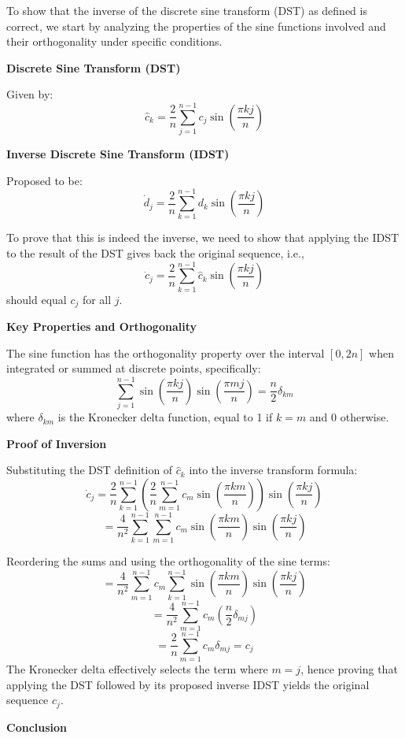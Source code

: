 \documentclass[8pt]{article}
\begin{document}
To show that the inverse of the discrete sine transform (DST) as defined is correct, we start by analyzing the properties of the sine functions involved and their orthogonality under specific conditions.

\textbf{Discrete Sine Transform (DST)}

Given by:
\[
\hat{c}_k = \frac{2}{n} \sum_{j=1}^{n-1} c_j \sin \left( \frac{\pi kj}{n} \right)
\]

\textbf{Inverse Discrete Sine Transform (IDST)}

Proposed to be:
\[
\dot{d}_j = \frac{2}{n} \sum_{k=1}^{n-1} d_k \sin \left( \frac{\pi kj}{n} \right)
\]

To prove that this is indeed the inverse, we need to show that applying the IDST to the result of the DST gives back the original sequence, i.e.,
\[
\dot{c}_j = \frac{2}{n} \sum_{k=1}^{n-1} \hat{c}_k \sin \left( \frac{\pi kj}{n} \right)
\]
should equal \( c_j \) for all \( j \).

\textbf{Key Properties and Orthogonality}

The sine function has the orthogonality property over the interval \([0, 2n]\) when integrated or summed at discrete points, specifically:
\[
\sum_{j=1}^{n-1} \sin \left( \frac{\pi kj}{n} \right) \sin \left( \frac{\pi mj}{n} \right) = \frac{n}{2} \delta_{km}
\]
where \( \delta_{km} \) is the Kronecker delta function, equal to 1 if \( k = m \) and 0 otherwise.

\textbf{Proof of Inversion}

Substituting the DST definition of \( \hat{c}_k \) into the inverse transform formula:
\[
\dot{c}_j = \frac{2}{n} \sum_{k=1}^{n-1} \left( \frac{2}{n} \sum_{m=1}^{n-1} c_m \sin \left( \frac{\pi km}{n} \right) \right) \sin \left( \frac{\pi kj}{n} \right)
\]
\[
= \frac{4}{n^2} \sum_{k=1}^{n-1} \sum_{m=1}^{n-1} c_m \sin \left( \frac{\pi km}{n} \right) \sin \left( \frac{\pi kj}{n} \right)
\]

Reordering the sums and using the orthogonality of the sine terms:
\[
= \frac{4}{n^2} \sum_{m=1}^{n-1} c_m \sum_{k=1}^{n-1} \sin \left( \frac{\pi km}{n} \right) \sin \left( \frac{\pi kj}{n} \right)
\]
\[
= \frac{4}{n^2} \sum_{m=1}^{n-1} c_m \left( \frac{n}{2} \delta_{mj} \right)
\]
\[
= \frac{2}{n} \sum_{m=1}^{n-1} c_m \delta_{mj} = c_j
\]
The Kronecker delta effectively selects the term where \( m = j \), hence proving that applying the DST followed by its proposed inverse IDST yields the original sequence \( c_j \).

\textbf{Conclusion}
\end{document}
